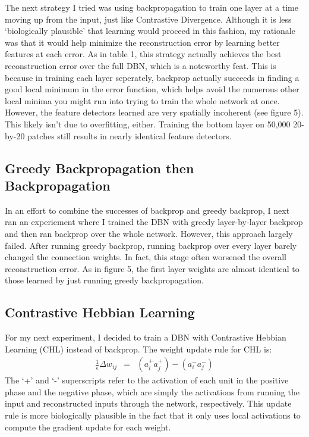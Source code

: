 \documentclass{article} %
\begin{document}
The next strategy I tried was using backpropagation to train one layer at a time moving up from the input, just like Contrastive Divergence. Although it is less `biologically plausible' that learning would proceed in this fashion, my rationale was that it would help minimize the reconstruction error by learning better features at each error. As in table 1, this strategy actually achieves the best reconstruction error over the full DBN, which is a noteworthy feat. This is because in training each layer seperately, backprop actually succeeds in finding a good local minimum in the error function, which helps avoid the numerous other local minima you might run into trying to train the whole network at once. However, the feature detectors learned are very spatially incoherent (see figure 5). This likely isn't due to overfitting, either. Training the bottom layer on 50,000 20-by-20 patches still results in nearly identical feature detectors. 

\subsection{Greedy Backpropagation then Backpropagation}

In an effort to combine the successes of backprop and greedy backprop, I next ran an experiement where I trained the DBN with greedy layer-by-layer backprop and then ran backprop over the whole network. However, this approach largely failed. After running greedy backprop, running backprop over every layer barely changed the connection weights. In fact, this stage often worsened the overall reconstruction error. As in figure 5, the first layer weights are almost identical to those learned by just running greedy backpropagation.

\subsection{Contrastive Hebbian Learning}

For my next experiment, I decided to train a DBN with Contrastive Hebbian Learning (CHL) instead of backprop. The weight update rule for CHL is:
\begin{eqnarray*}
\frac{1}{\epsilon}\Delta w_{ij} &=& (a^+_i a^+_j) - (a^-_i a^-_j)  
\end{eqnarray*}
The `+' and `-' superscripts refer to the activation of each unit in the positive phase and the negative phase, which are simply the activations from running the input and reconstructed inputs through the network, respectively. This update rule is more biologically plausible in the fact that it only uses local activations to compute the gradient update for each weight. 
\end{document}
